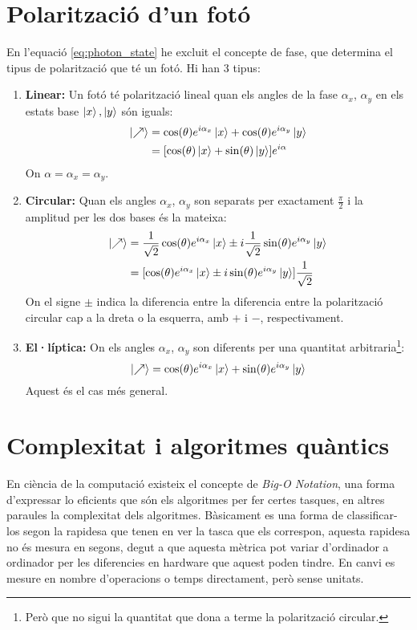 \chapter{Polarització d'un fotó}
\label{appendix:optics}
En l'equació \ref{eq:photon_state} he excluit el concepte de fase, que determina el tipus de polarització que té un fotó. Hi han 3 tipus:
\begin{enumerate}
	\item \textbf{Linear:}
	Un fotó té polarització lineal quan els angles de la fase $\alpha_x$, $\alpha_y$ en els estats base $\ket{x},\ket{y}$ són iguals:
	\begin{align*}
		\ket{\nearrow} &= \cos(\theta) e^{i\alpha_x}\ket{x} + \cos(\theta)e^{i\alpha_y}\ket{y} \\
		&= [\cos(\theta)\ket{x} + \sin(\theta)\ket{y}]e^{i\alpha}
	\end{align*}
	On $\alpha=\alpha_x=\alpha_y$.
	\item \textbf{Circular:}
	Quan els angles $\alpha_x$, $\alpha_y$ son separats per exactament $\frac{\pi}{2}$ i la amplitud per les dos bases és la mateixa:
	\begin{align*}
		\ket{\nearrow} &= \frac{1}{\sqrt{2}}\cos(\theta)e^{i\alpha_x}\ket{x} \pm i\frac{1}{\sqrt{2}}\sin(\theta)e^{i\alpha_y}\ket{y} \\
					   &= [\cos(\theta)e^{i\alpha_x}\ket{x} \pm i\sin(\theta)e^{i\alpha_y}\ket{y}]\frac{1}{\sqrt{2}}
	\end{align*}
	On el signe $\pm$ indica la diferencia entre la diferencia entre la polarització circular cap a la dreta o la esquerra, amb $+$ i $-$, respectivament.
	\item \textbf{El·líptica:}
	On els angles $\alpha_x$, $\alpha_y$ son diferents per una quantitat arbitraria\footnote{Però que no sigui la quantitat que dona a terme la polarització circular.}:
	$$
	\ket{\nearrow} = \cos(\theta)e^{i\alpha_x}\ket{x} + \sin(\theta)e^{i\alpha_y}\ket{y}
	$$
	Aquest és el cas més general.
	
\end{enumerate}

\chapter{Complexitat i algoritmes quàntics}
\label{complexity}
En ciència de la computació existeix el concepte de \textit{Big-O Notation}, una forma d'expressar lo eficients que són els algoritmes per fer certes tasques, en altres paraules la complexitat dels algoritmes. Bàsicament es una forma de classificar-los segon la rapidesa que tenen en ver la tasca que els correspon, aquesta rapidesa no és mesura en segons, degut a que aquesta mètrica pot variar d'ordinador a ordinador per les diferencies en hardware que aquest poden tindre. En canvi es mesure en nombre d'operacions o temps directament, però sense unitats. 

